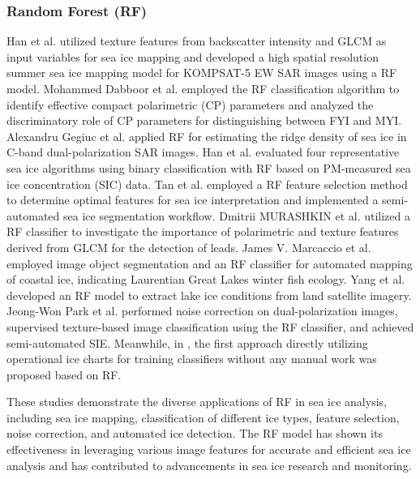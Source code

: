 \subsubsection{Random Forest (RF)}
Han et al. \cite{30han2017study} utilized texture features from backscatter intensity and GLCM as input variables for sea ice mapping and developed a high spatial resolution summer sea ice mapping model for KOMPSAT-5 EW SAR images using a RF model. Mohammed Dabboor et al. \cite{31dabboor2018assessment,32dabboor2018assessment} employed the RF classification algorithm to identify effective compact polarimetric (CP) parameters and analyzed the discriminatory role of CP parameters for distinguishing between FYI and MYI. Alexandru Gegiuc et al. \cite{33gegiuc2018estimation} applied RF for estimating the ridge density of sea ice in C-band dual-polarization SAR images. Han et al. \cite{34han2018evaluation} evaluated four representative sea ice algorithms using binary classification with RF based on PM-measured sea ice concentration (SIC) data. Tan et al. \cite{35tan2018semiautomated} employed a RF feature selection method to determine optimal features for sea ice interpretation and implemented a semi-automated sea ice segmentation workflow. Dmitrii MURASHKIN et al. \cite{36murashkin2018method} utilized a RF classifier to investigate the importance of polarimetric and texture features derived from GLCM for the detection of leads. James V. Marcaccio et al. \cite{37marcaccio2022automated} employed image object segmentation and an RF classifier for automated mapping of coastal ice, indicating Laurentian Great Lakes winter fish ecology. Yang et al. \cite{39yang2021simple} developed an RF model to extract lake ice conditions from land satellite imagery. Jeong-Won Park et al. \cite{41park2020classification} performed noise correction on dual-polarization images, supervised texture-based image classification using the RF classifier, and achieved semi-automated SIE. Meanwhile, in \cite{40park2019automated}, the first approach directly utilizing operational ice charts for training classifiers without any manual work was proposed based on RF.

These studies demonstrate the diverse applications of RF in sea ice analysis, including sea ice mapping, classification of different ice types, feature selection, noise correction, and automated ice detection. The RF model has shown its effectiveness in leveraging various image features for accurate and efficient sea ice analysis and has contributed to advancements in sea ice research and monitoring.


